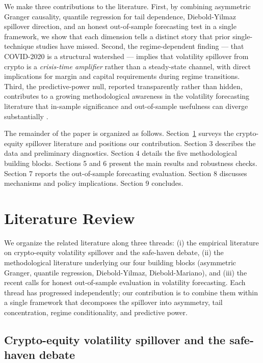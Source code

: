 \documentclass[11pt,a4paper]{article}
\begin{document}
We make three contributions to the literature. First, by combining asymmetric Granger causality, quantile regression for tail dependence, Diebold-Yilmaz spillover direction, and an honest out-of-sample forecasting test in a single framework, we show that each dimension tells a distinct story that prior single-technique studies have missed. Second, the regime-dependent finding --- that COVID-2020 is a structural watershed --- implies that volatility spillover from crypto is a \emph{crisis-time amplifier} rather than a steady-state channel, with direct implications for margin and capital requirements during regime transitions. Third, the predictive-power null, reported transparently rather than hidden, contributes to a growing methodological awareness in the volatility forecasting literature that in-sample significance and out-of-sample usefulness can diverge substantially \citep{harvey2016, conrad2020}.

The remainder of the paper is organized as follows. Section~\ref{sec:lit} surveys the crypto-equity spillover literature and positions our contribution. Section 3 describes the data and preliminary diagnostics. Section 4 details the five methodological building blocks. Sections 5 and 6 present the main results and robustness checks. Section 7 reports the out-of-sample forecasting evaluation. Section 8 discusses mechanisms and policy implications. Section 9 concludes.

\section{Literature Review}
\label{sec:lit}

We organize the related literature along three threads: (i) the empirical literature on crypto-equity volatility spillover and the safe-haven debate, (ii) the methodological literature underlying our four building blocks (asymmetric Granger, quantile regression, Diebold-Yilmaz, Diebold-Mariano), and (iii) the recent calls for honest out-of-sample evaluation in volatility forecasting. Each thread has progressed independently; our contribution is to combine them within a single framework that decomposes the spillover into asymmetry, tail concentration, regime conditionality, and predictive power.

\subsection{Crypto-equity volatility spillover and the safe-haven debate}
\end{document}
